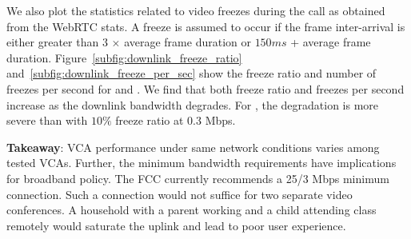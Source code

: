 We also plot the statistics related to video freezes during the call as obtained from the WebRTC stats. A freeze is assumed to occur if the frame inter-arrival is either greater than 3 $\times$ average frame duration or $150 ms$ + average frame duration.  Figure~\ref{subfig:downlink_freeze_ratio} and~\ref{subfig:downlink_freeze_per_sec} show the freeze ratio and number of freezes per second for \meet and \teamsbrowser. We find that both freeze ratio and freezes per second increase as the downlink bandwidth degrades. For \meet, the degradation is more severe than \teamsbrowser with $10\%$ freeze ratio at 0.3 Mbps. 





\textbf{Takeaway}: VCA performance under same network conditions varies among tested VCAs. Further, the minimum bandwidth requirements have implications for broadband policy. The FCC currently recommends a 25/3 Mbps minimum connection. Such a connection would not suffice for two separate video conferences. A household with a parent working and a child attending class remotely would saturate the uplink and lead to poor user experience. 









